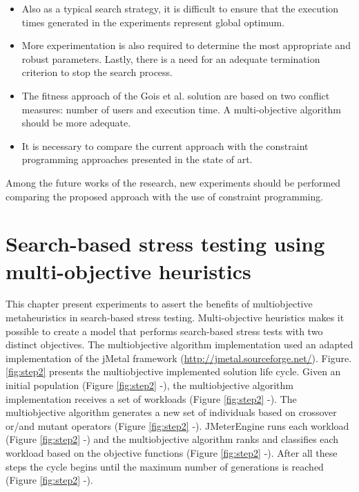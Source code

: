 \documentclass{report}
\begin{document}
\begin{itemize}
\item Also as a typical search strategy, it is difficult to ensure that the execution times generated in the experiments represent global optimum.
\item More experimentation is also required to determine the most appropriate and robust parameters. Lastly, there is a need for an adequate termination criterion to stop the search process.
\item The fitness approach of the Gois et al. solution are based on two conflict measures: number of users and execution time. A multi-objective algorithm should be more adequate.
\item It is necessary to compare the current approach with the constraint programming approaches presented in the state of art.

\end{itemize}

Among the future works of the research, new experiments should be performed comparing the proposed approach with the use of constraint programming.


\FloatBarrier

\chapter{Search-based stress testing using multi-objective heuristics}

This chapter present experiments to assert the benefits of multiobjective metaheuristics in search-based stress testing. Multi-objective heuristics makes it possible to create a model that performs search-based stress tests with  two distinct objectives. The multiobjective algorithm implementation used an adapted implementation of the jMetal framework (\url{http://jmetal.sourceforge.net/}). Figure. \ref{fig:step2} presents the multiobjective implemented solution life cycle. Given an initial population (Figure \ref{fig:step2}  -),  the multiobjective algorithm implementation receives a set of workloads  (Figure \ref{fig:step2}  -). The multiobjective algorithm generates a new set of individuals based on crossover or/and mutant operators (Figure \ref{fig:step2}  -).  JMeterEngine runs each workload (Figure \ref{fig:step2}  -) and the multiobjective algorithm ranks and classifies each workload based on the objective functions  (Figure \ref{fig:step2}  -).  After all these steps the cycle begins until the maximum number of generations is reached (Figure \ref{fig:step2}  -).
\end{document}
